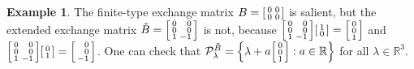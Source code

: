 \documentclass{amsart}
\theoremstyle{definition}
\newtheorem{example}[proposition]{Example}
\theoremstyle{remark}
\numberwithin{equation}{section}
\newcommand{\reals}{\mathbb R}
\newcommand{\settt}[1]{{\Bigl\lbrace #1 \Bigr\rbrace}}
\newcommand{\0}{{\mathbf{0}}}
\newcommand{\tB}{{\tilde{B}}}
\renewcommand{\P}{\mathcal{P}}
\begin{document}
\begin{example}\label{0000 bad}
The finite-type exchange matrix $B=\begin{bsmallmatrix}0&0\\0&0\end{bsmallmatrix}$ is salient, but the extended exchange matrix $\tB=\begin{bsmallmatrix*}[r]0&0\\0&0\\1&-1\end{bsmallmatrix*}$ is not, because $\begin{bsmallmatrix*}[r]0&0\\0&0\\1&-1\end{bsmallmatrix*}\begin{bsmallmatrix}1\\0\end{bsmallmatrix}=\begin{bsmallmatrix}0\\0\\1\end{bsmallmatrix}$ and $\begin{bsmallmatrix*}[r]0&0\\0&0\\1&-1\end{bsmallmatrix*}\begin{bsmallmatrix}0\\1\end{bsmallmatrix}=\begin{bsmallmatrix*}[r]0\\0\\-1\end{bsmallmatrix*}$.
One can check that $\P_\lambda^\tB=\settt{\lambda+a\begin{bsmallmatrix*}[r]0\\0\\1\end{bsmallmatrix*}:a\in\reals}$ for all $\lambda\in\reals^3$.
\end{example}
\end{document}
